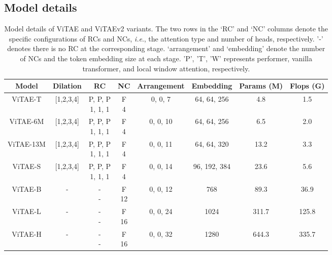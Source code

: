 \documentclass[twocolumn]{svjour3}          \smartqed  \usepackage{natbib}
\newcommand{\ie}{i.e}
\def\onedot{.\xspace}
\def\ie{\emph{i.e}\onedot}
\begin{document}
\subsection{Model details}
\begin{table*}[htbp]
  \centering
  \caption{Model details of ViTAE and ViTAEv2 variants. The two rows in the `RC' and `NC' columns denote the specific configurations of RCs and NCs, \ie, the attention type and number of heads, respectively. '-' denotes there is no RC at the corresponding stage. `arrangement' and `embedding' denote the number of NCs and the token embedding size at each stage. 'P', 'T', 'W' represents performer, vanilla transformer, and local window attention, respectively.}
    \begin{tabular}{c|c|cc|c|c|c|c}
    \hline
    Model & Dilation & RC & NC & Arrangement & Embedding & Params (M) & Flops (G) \\
    \hline
    ViTAE-T & [1,2,3,4] &  \makecell[c]{P, P, P \\ 1, 1, 1} & \makecell[c]{F \\ 4} & 0, 0, 7 & 64, 64, 256 & 4.8   & 1.5 \\
    \hline
    ViTAE-6M & [1,2,3,4] &  \makecell[c]{P, P, P \\ 1, 1, 1} & \makecell[c]{F \\ 4} & 0, 0, 10 & 64, 64, 256 & 6.5   & 2.0 \\
    \hline
    ViTAE-13M & [1,2,3,4] &  \makecell[c]{P, P, P \\ 1, 1, 1} & \makecell[c]{F \\ 4} & 0, 0, 11 & 64, 64, 320 & 13.2  & 3.3 \\
    \hline
    ViTAE-S & [1,2,3,4] &   \makecell[c]{P, P, P \\ 1, 1, 1} & \makecell[c]{F \\ 4} & 0, 0, 14 & 96, 192, 384 & 23.6  & 5.6 \\
    \hline
    ViTAE-B & - &   \makecell[c]{- \\ -} & \makecell[c]{F \\ 12} & 0, 0, 12 & 768 & 89.3  & 36.9 \\
    \hline
    ViTAE-L & - &   \makecell[c]{- \\ -} & \makecell[c]{F \\ 16} & 0, 0, 24 & 1024 & 311.7  & 125.8 \\
    \hline
    ViTAE-H & - &   \makecell[c]{- \\ -} & \makecell[c]{F \\ 16} & 0, 0, 32 & 1280 & 644.3 & 335.7 \\

\end{tabular}
\end{table*}
\end{document}
